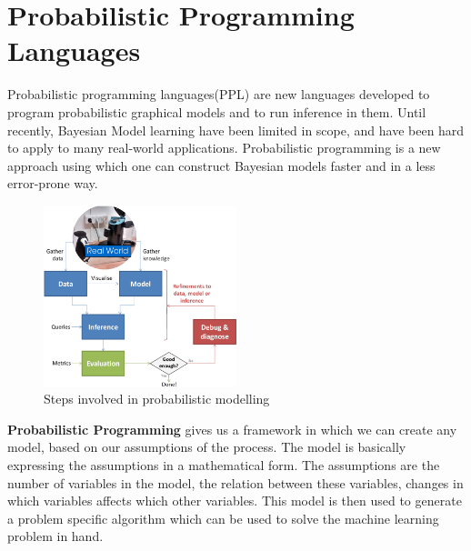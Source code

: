 \section{Probabilistic Programming Languages}

Probabilistic programming languages(PPL) are new languages developed to program probabilistic graphical models and to run inference in them. Until recently, Bayesian Model learning have been limited in scope, and have been hard to apply to many real-world applications. Probabilistic programming is a new approach using which one can construct Bayesian models faster and in a less error-prone way. 


\begin{figure}[htp]
\centering
\includegraphics[width=0.5\textwidth]{pictures/Lifecycle.png}
\caption[Steps involved in probabilistic modelling ]{Steps involved in probabilistic modelling  \protect\footnotemark }
\label{}
\end{figure}

\textbf{Probabilistic Programming} gives us a framework in which we can create any model, based on our assumptions of the process. The model is basically expressing the assumptions in a mathematical form. The assumptions are the number of variables in the model, the relation between these variables, changes in which variables affects which other variables. This model is then used to generate a problem specific algorithm which can be used to solve the machine learning problem in hand. 

